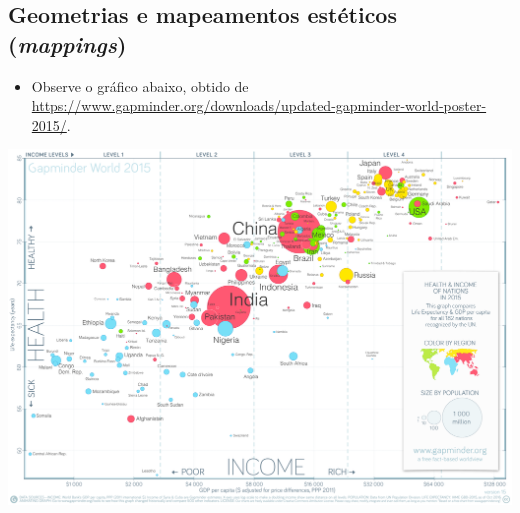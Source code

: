 \documentclass[
  11pt]{report}
\providecommand{\tightlist}{%
  \setlength{\itemsep}{0pt}\setlength{\parskip}{0pt}}
\begin{document}
\hypertarget{geometrias-e-mapeamentos-estuxe9ticos-mappings}{%
\subsection{\texorpdfstring{Geometrias e mapeamentos estéticos (\emph{mappings})}{Geometrias e mapeamentos estéticos (mappings)}}\label{geometrias-e-mapeamentos-estuxe9ticos-mappings}}

\begin{itemize}
\tightlist
\item
  Observe o gráfico abaixo, obtido de \url{https://www.gapminder.org/downloads/updated-gapminder-world-poster-2015/}.
\end{itemize}

\begin{center}\includegraphics[width=1\linewidth]{images/countries-1} \end{center}
\end{document}
